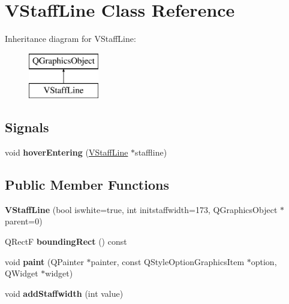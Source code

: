 \hypertarget{class_v_staff_line}{}\section{V\+Staff\+Line Class Reference}
\label{class_v_staff_line}
Inheritance diagram for V\+Staff\+Line\+:\begin{figure}[H]
\begin{center}
\leavevmode
\includegraphics[height=2.000000cm]{class_v_staff_line}
\end{center}
\end{figure}
\subsection*{Signals}
\begin{DoxyCompactItemize}
\item 
\hypertarget{class_v_staff_line_ab68a189c08552b4c039f904ecd339e71}{}void {\bfseries hover\+Entering} (\hyperlink{class_v_staff_line}{V\+Staff\+Line} $\ast$staffline)\label{class_v_staff_line_ab68a189c08552b4c039f904ecd339e71}

\end{DoxyCompactItemize}
\subsection*{Public Member Functions}
\begin{DoxyCompactItemize}
\item 
\hypertarget{class_v_staff_line_aec47a7b0b853e3e8ec8d0cc527088db1}{}{\bfseries V\+Staff\+Line} (bool iswhite=true, int initstaffwidth=173, Q\+Graphics\+Object $\ast$parent=0)\label{class_v_staff_line_aec47a7b0b853e3e8ec8d0cc527088db1}

\item 
\hypertarget{class_v_staff_line_ae2e42820d76de2c34f1f546fd1dde643}{}Q\+Rect\+F {\bfseries bounding\+Rect} () const \label{class_v_staff_line_ae2e42820d76de2c34f1f546fd1dde643}

\item 
\hypertarget{class_v_staff_line_a9bf019b9c17fc3d64634127eed4682c8}{}void {\bfseries paint} (Q\+Painter $\ast$painter, const Q\+Style\+Option\+Graphics\+Item $\ast$option, Q\+Widget $\ast$widget)\label{class_v_staff_line_a9bf019b9c17fc3d64634127eed4682c8}

\item 
\hypertarget{class_v_staff_line_ae64934fb567dedfef9cd9acdc8bce4b0}{}void {\bfseries add\+Staffwidth} (int value)\label{class_v_staff_line_ae64934fb567dedfef9cd9acdc8bce4b0}

\end{DoxyCompactItemize}
